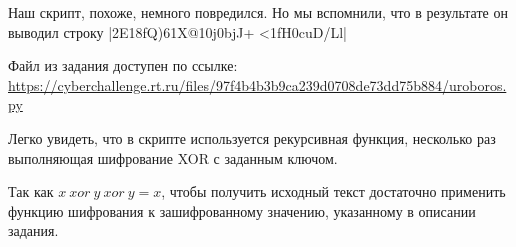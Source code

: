
Наш скрипт, похоже, немного повредился. Но мы вспомнили, что в результате он выводил строку
|2E\x18fQ)61X@\x10j\x0bjJ+ <\x1fH\x0cuD/Ll|

Файл из задания доступен по ссылке: \url{https://cyberchallenge.rt.ru/files/97f4b4b3b9ca239d0708de73dd75b884/uroboros.py}

\solutionSection

Легко увидеть, что в скрипте используется рекурсивная функция, несколько раз выполняющая шифрование XOR с заданным ключом.

Так как $x \: xor \: y \: xor \: y = x$, чтобы получить исходный текст достаточно применить функцию шифрования к зашифрованному значению, указанному в описании задания.

